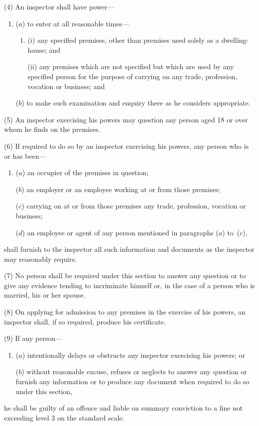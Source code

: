 \documentclass[12pt,a4paper]{article}
\begin{document}
(4) An inspector shall have power—
\begin{enumerate}\item[]
($a$) to enter at all reasonable times—
\begin{enumerate}\item[]
(i) any specified premises, other than premises used solely as a dwelling-house; and

(ii) any premises which are not specified but which are used by any specified person for the purpose of carrying on any trade, profession, vocation or business; and
\end{enumerate}

($b$) to make such examination and enquiry there as he considers appropriate.
\end{enumerate}

(5) An inspector exercising his powers may question any person aged 18 or over whom he finds on the premises.

(6) If required to do so by an inspector exercising his powers, any person who is or has been—
\begin{enumerate}\item[]
($a$) an occupier of the premises in question;

($b$) an employer or an employee working at or from those premises;

($c$) carrying on at or from those premises any trade, profession, vocation or business;

($d$) an employee or agent of any person mentioned in paragraphs ($a$)  to~($c$),
\end{enumerate}
shall furnish to the inspector all such information and documents as the inspector may reasonably require.

(7) No person shall be required under this section to answer any question or to give any evidence tending to incriminate himself or, in the case of a person who is married, his or her spouse.

(8) On applying for admission to any premises in the exercise of his powers, an inspector shall, if so required, produce his certificate.

(9) If any person—
\begin{enumerate}\item[]
($a$) intentionally delays or obstructs any inspector exercising his powers; or

($b$) without reasonable excuse, refuses or neglects to answer any question or furnish any information or to produce any document when required to do so under this section,
\end{enumerate}
he shall be guilty of an offence and liable on summary conviction to a fine not exceeding level 3 on the standard scale.
\end{document}
